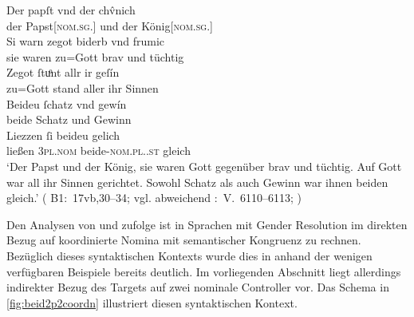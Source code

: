 \begin{exe}
\ex\label{ex:papstkoenig5} %
	\gll Der papſt vnd der chv̂nich \\
		der Papst[\textsc{nom.sg.\MascM}] und der König[\textsc{nom.sg.\MascM}]
		\\
\sn \gll Si warn zegot biderb vnd frumic \\
		sie waren {zu=Gott} brav und tüchtig \\
\sn \gll Zegot ſtuͦnt allr ir geſín \\
		{zu=Gott} stand aller ihr Sinnen \\
\sn \gll Beideu ſchatz vnd gewín \\
		beide Schatz und Gewinn \\
\sn \gll Liezzen ſi beideu gelich \\
		ließen \textsc{3pl\subM.nom} beide-\textsc{nom.pl.\NeutM.st} gleich \\
	\trans `Der Papst und der König, sie waren Gott gegenüber brav und
		tüchtig. Auf Gott war all ihr Sinnen gerichtet. Sowohl Schatz als auch
		Gewinn war ihnen beiden gleich.'
		(%
			B1:~17vb,30--34; vgl. abweichend
			\KC:~V.~6110--6113;
			\cite[202]{schroeder1895}%
		)
\end{exe}

Den Analysen von \citet{wechsler2009} und \citet{wechslerzlatic2003} zufolge
ist in Sprachen mit Gender Resolution im direkten Bezug auf koordinierte Nomina
mit semantischer Kongruenz zu rechnen. Bezüglich dieses syntaktischen Kontexts
wurde dies in  anhand der wenigen verfügbaren Beispiele
bereits deutlich. Im vorliegenden Abschnitt liegt allerdings indirekter Bezug
des Targets  auf zwei nominale Controller vor. Das Schema in
\cref{fig:beid2p2coordn} illustriert diesen syntaktischen Kontext.


